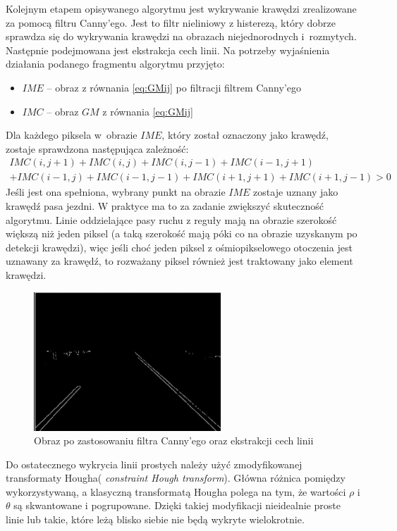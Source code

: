 Kolejnym etapem opisywanego algorytmu jest wykrywanie krawędzi zrealizowane za pomocą filtru Canny'ego. 
Jest to filtr nieliniowy z histerezą, który dobrze sprawdza się do wykrywania krawędzi na obrazach niejednorodnych i~rozmytych. 
Następnie podejmowana jest ekstrakcja cech linii. 
Na potrzeby wyjaśnienia działania podanego fragmentu algorytmu przyjęto:
\begin{itemize}
\item $IME$ -- obraz z równania \eqref{eq:GMij} po filtracji filtrem Canny'ego
\item $IMC$ -- obraz $GM$ z równania \eqref{eq:GMij}
\end{itemize}

Dla każdego piksela w~obrazie $IME$, który został oznaczony jako krawędź, zostaje sprawdzona następująca zależność:
\begin{equation}
	\begin{matrix}
	IMC(i,j+1)+IMC(i,j)+IMC(i,j-1)+IMC(i-1,j+1)\\
	+IMC(i-1,j)+IMC(i-1,j-1)+IMC(i+1,j+1)+IMC(i+1,j-1)>0
	\end{matrix}
\end{equation}
Jeśli jest ona spełniona, wybrany punkt na obrazie $IME$ zostaje uznany jako krawędź pasa jezdni.
W praktyce ma to za zadanie zwiększyć skuteczność algorytmu. Linie oddzielające pasy ruchu z reguły mają na obrazie szerokość większą niż jeden piksel (a taką szerokość mają póki co na obrazie uzyskanym po detekcji krawędzi), więc jeśli choć jeden piksel z ośmiopikselowego otoczenia jest uznawany za krawędź, to rozważany piksel również jest traktowany jako element krawędzi.

\begin{figure}
  \centering
  \includegraphics[width=7cm]{img/canny.png}
  \caption{Obraz po zastosowaniu filtra Canny'ego oraz ekstrakcji cech linii\cite{T3}}
  \label{fig:canny}
\end{figure}

Do ostatecznego wykrycia linii prostych należy użyć zmodyfikowanej transformaty Hougha( \textit{constraint Hough transform}). 
Główna różnica pomiędzy wykorzystywaną, a klasyczną transformatą Hougha polega na tym, że wartości $\rho$ i $\theta$ są skwantowane i pogrupowane. 
Dzięki takiej modyfikacji nieidealnie proste linie lub takie, które leżą blisko siebie nie będą wykryte wielokrotnie. %

